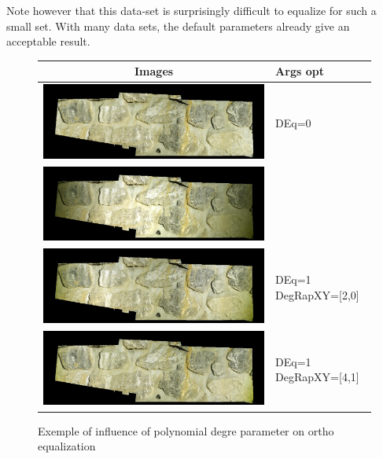 Note however that this data-set is surprisingly difficult to equalize for such a
small set. With many data sets, the default parameters already give an acceptable result.

\begin{figure}
\begin{tabular} { | c | p{2 cm} |  } \hline
 Images   &    Args opt  \\  \hline \hline
\includegraphics[width=150mm]{FIGS/MurSaintMartin/Ortho-Eg-Test-Redr-0-0.jpg}  &    DEq=0 \\  \hline
\includegraphics[width=150mm]{FIGS/MurSaintMartin/Ortho-Eg-Test-Redr-1-0.jpg}  &      \\  \hline
\includegraphics[width=150mm]{FIGS/MurSaintMartin/Ortho-Eg-Test-Redr-1-2.jpg}  &    DEq=1 DegRapXY=[2,0] \\  \hline
\includegraphics[width=150mm]{FIGS/MurSaintMartin/Ortho-Eg-Test-Redr-1-4_1.jpg}  &    DEq=1 DegRapXY=[4,1] \\  \hline
\end{tabular}
\caption{Exemple of influence of polynomial degre parameter on ortho equalization}
\label{Tab:Ortho:Polyn}
\end{figure}


